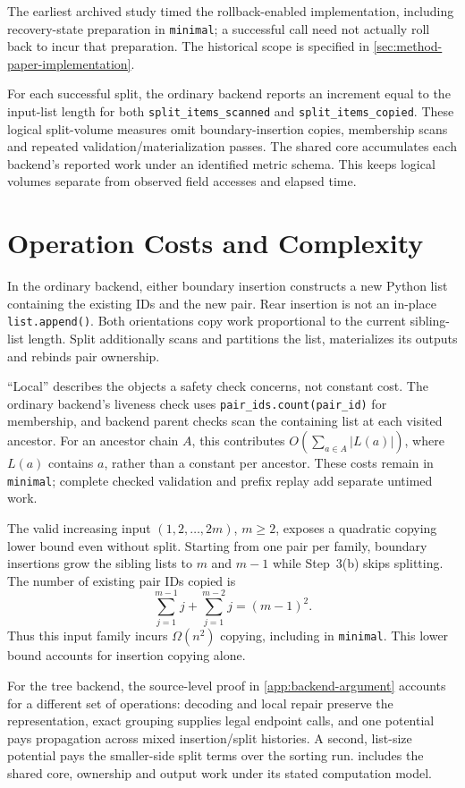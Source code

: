 The earliest archived study timed the rollback-enabled implementation,
including recovery-state preparation in \texttt{minimal}; a successful call
need not actually roll back to incur that preparation. The historical scope
is specified in \cref{sec:method-paper-implementation}.

For each successful split, the ordinary backend reports an increment equal
to the input-list length for both \texttt{split\_items\_scanned} and
\texttt{split\_items\_copied}. These logical split-volume measures omit
boundary-insertion copies, membership scans and repeated validation/materialization
passes. The shared core accumulates each backend's reported work under an
identified metric schema. This keeps logical volumes separate from observed
field accesses and elapsed time.

\section{Operation Costs and Complexity}
\label{sec:implementation-complexity}

In the ordinary backend, either boundary insertion constructs a new Python list containing the
existing IDs and the new pair. Rear insertion is not an in-place
\texttt{list.append()}. Both orientations copy work proportional to the
current sibling-list length. Split additionally scans and partitions the
list, materializes its outputs and rebinds pair ownership.

``Local'' describes the objects a safety check concerns, not constant cost.
The ordinary backend's liveness check uses
\texttt{pair\_ids.count(pair\_id)} for membership,
and backend parent checks scan the containing list at each visited ancestor.
For an ancestor chain $A$, this contributes
$O(\sum_{a\in A}|L(a)|)$, where $L(a)$ contains $a$, rather than a constant
per ancestor. These costs remain in \texttt{minimal}; complete checked
validation and prefix replay add separate untimed work.

The valid increasing input $(1,2,\ldots,2m)$, $m\geq2$, exposes a quadratic
copying lower bound even without split. Starting from one pair per family,
boundary insertions grow the sibling lists to $m$ and $m-1$ while Step~3(b)
skips splitting. The number of existing pair IDs copied is
\begin{equation}
  \sum_{j=1}^{m-1}j+\sum_{j=1}^{m-2}j=(m-1)^2.
  \label{eq:implementation-boundary-copy-lower-bound}
\end{equation}
Thus this input family incurs $\Omega(n^2)$ copying, including in
\texttt{minimal}. This lower bound accounts for insertion copying alone.

For the tree backend, the source-level proof in \cref{app:backend-argument}
accounts for a different set of operations:
decoding and local repair preserve the representation, exact grouping supplies
legal endpoint calls, and one potential pays propagation across mixed
insertion/split histories. A second, list-size potential pays the smaller-side
split terms over the sorting run.  includes the shared
core, ownership and output work under its stated computation model.
